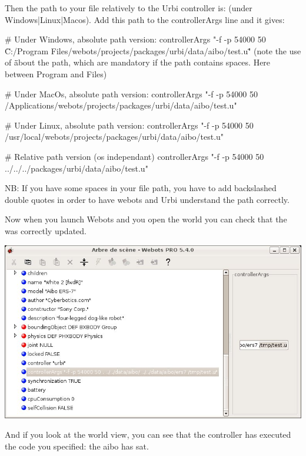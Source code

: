 Then the path to your file relatively to the Urbi controller is:
 (under
Windows|Linux|Macos).  Add this path to the controllerArgs line and it
gives:

\begin{shell}
# Under Windows, absolute path version:
controllerArgs "-f -p 54000 50 \"C:/Program Files/webots/projects/packages/urbi/data/aibo/test.u\""
(note the use of \" \" about the path, which are mandatory if the path
contains spaces. Here between Program and Files)

# Under MacOs, absolute path version:
controllerArgs "-f -p 54000 50 /Applications/webots/projects/packages/urbi/data/aibo/test.u"

# Under Linux, absolute path version:
controllerArgs "-f -p 54000 50 /usr/local/webots/projects/packages/urbi/data/aibo/test.u"

# Relative path version (os independant)
controllerArgs "-f -p 54000 50 ../../../packages/urbi/data/aibo/test.u"
\end{shell}

NB: If you have some spaces in your file path, you have to add
backslashed double quotes in order to have webots and Urbi understand
the path correctly.

Now when you launch Webots and you open the world
 you can check that the
 was correctly updated.

\begin{center}
  \includegraphics[width=.8\linewidth]{img/webots/scene-tree-add-loaded-file}
\end{center}

And if you look at the world view, you can see that the controller has
executed the \urbi code you specified: the aibo has sat.

